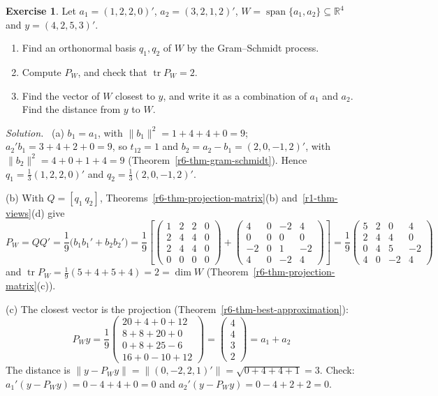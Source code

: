 \documentclass[12pt]{article}
\newcommand{\R}{\mathbb R}
\DeclareMathOperator{\tr}{tr}
\DeclareMathOperator{\Span}{span}
\theoremstyle{definition}
\newtheorem{exercise}{Exercise}
\newenvironment{solution}{\par\noindent\textit{Solution.}\ }{\par\smallskip}
\begin{document}
\begin{exercise}\label{r6-ex-two-vector-span}
Let \(a_1=(1,2,2,0)'\), \(a_2=(3,2,1,2)'\), \(W=\Span\{a_1,a_2\}\subseteq\R^4\) and \(y=(4,2,5,3)'\).
\begin{enumerate}
\item Find an orthonormal basis \(q_1,q_2\) of \(W\) by the Gram--Schmidt process.
\item Compute \(P_W\), and check that \(\tr P_W=2\).
\item Find the vector of \(W\) closest to \(y\), and write it as a combination of \(a_1\) and \(a_2\). Find the
distance from \(y\) to \(W\).
\end{enumerate}
\end{exercise}
\begin{solution}
(a) \(b_1=a_1\), with \(\lVert b_1\rVert^2=1+4+4+0=9\); \(a_2'b_1=3+4+2+0=9\), so \(t_{12}=1\) and
\(b_2=a_2-b_1=(2,0,-1,2)'\), with \(\lVert b_2\rVert^2=4+0+1+4=9\) (Theorem~\ref{r6-thm-gram-schmidt}). Hence
\(q_1=\frac13(1,2,2,0)'\) and \(q_2=\frac13(2,0,-1,2)'\).

(b) With \(Q=[q_1\ q_2]\), Theorems~\ref{r6-thm-projection-matrix}(b) and~\ref{r1-thm-views}(d) give
\[
P_W=QQ'=\frac19\bigl(b_1b_1'+b_2b_2'\bigr)
=\frac19\left[\begin{pmatrix}1&2&2&0\\2&4&4&0\\2&4&4&0\\0&0&0&0\end{pmatrix}
+\begin{pmatrix}4&0&-2&4\\0&0&0&0\\-2&0&1&-2\\4&0&-2&4\end{pmatrix}\right]
=\frac19\begin{pmatrix}5&2&0&4\\2&4&4&0\\0&4&5&-2\\4&0&-2&4\end{pmatrix}
\]
and \(\tr P_W=\frac19(5+4+5+4)=2=\dim W\) (Theorem~\ref{r6-thm-projection-matrix}(c)).

(c) The closest vector is the projection (Theorem~\ref{r6-thm-best-approximation}):
\[
P_Wy=\frac19\begin{pmatrix}20+4+0+12\\8+8+20+0\\0+8+25-6\\16+0-10+12\end{pmatrix}=\begin{pmatrix}4\\4\\3\\2\end{pmatrix}
=a_1+a_2
\]
The distance is \(\lVert y-P_Wy\rVert=\lVert(0,-2,2,1)'\rVert=\sqrt{0+4+4+1}=3\). Check:
\(a_1'(y-P_Wy)=0-4+4+0=0\) and \(a_2'(y-P_Wy)=0-4+2+2=0\).
\end{solution}
\end{document}
